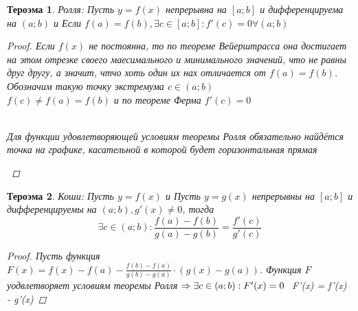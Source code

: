 \documentclass[oneside]{book}
\newtheorem{thm}{Тероэма}[chapter] %
\begin{document}
\begin{itemize}
\begin{thm}
Ролля: Пусть $y = f(x)$ непрерывна на $[a;b]$ и дифференцируема на $(a;b)$ и Если $f(a) = f(b), \exists c \in [a;b]: f'(c) = 0 \forall (a;b)$

\begin{proof}
  Если $f(x)$ не постоянна, то по теореме Вейерштрасса она достигает на этом отрезке своего маесимального и минимального значений, что не равны друг другу,
  а значит, чтчо хоть один их нах отличается от  $f(a) = f(b)$. Обозначим такую точку экстремума $c \in (a;b)$ \\
  $f(c) \neq f(a) = f(b)$ и по теореме Ферма $f'(c) = 0$
      \begin{center}
            \\
            Для функции удовлетворяющей условиям теоремы Ролля обязательно найдётся точка на графике, касательной в которой будет горизонтальная прямая
          \end{center}
  \end{proof}
\end{thm}
\begin{thm}
  Коши: Пусть $y = f(x)$ и Пусть $y = g(x)$ непрерывны на $[a; b]$ и дифференцируемы на $(a;b), g'(x) \neq 0$, тогда $$
    \exists c \in (a;b): \frac{f(a) - f(b)}{g(a) - g(b)} = \frac{f'(c)}{g'(c)}
  $$
  \begin{proof}
    Пусть функция $F(x) = f(x) - f(a) - \frac{f(b) - f(a)}{g(b) - g(a)} \cdot (g(x) - g(a))$.
    Функция $F$ уодвлетворяет условиям теоремы Ролля $\Rightarrow \\ \exists c \in (a; b): F'(x) = 0$
    $$
      F'(x) = f'(x) -  \cdot g'(x)


\end{proof}
\end{thm}
\end{itemize}
\end{document}

